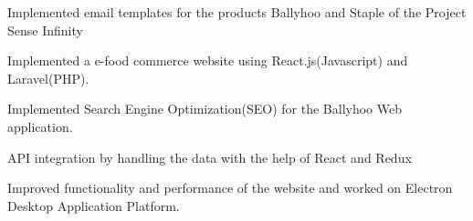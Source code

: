 \begin{cventries}
{\begin{cvitems}
        \item {Implemented email templates for the products Ballyhoo and Staple of the Project Sense Infinity}
        \item {Implemented a e-food commerce website using React.js(Javascript) and Laravel(PHP).}
        \item {Implemented Search Engine Optimization(SEO) for the Ballyhoo Web application.}
        \item {API integration by handling the data with the help of React and Redux}
        \item {Improved functionality and performance of the website and worked on Electron Desktop Application Platform.}
      \end{cvitems}
    }


\end{cventries}
